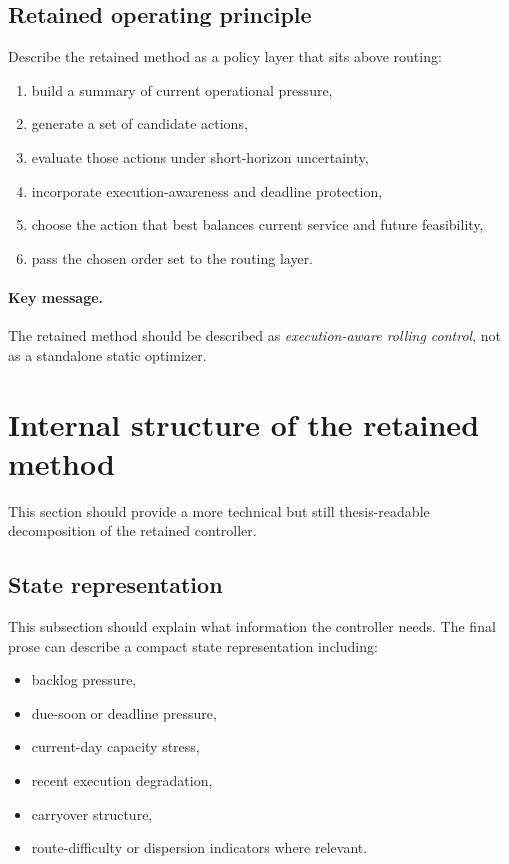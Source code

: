 \subsection{Retained operating principle}
\label{subsec:arch_retained_operating_principle}

Describe the retained method as a policy layer that sits above routing:
\begin{enumerate}
    \item build a summary of current operational pressure,
    \item generate a set of candidate actions,
    \item evaluate those actions under short-horizon uncertainty,
    \item incorporate execution-awareness and deadline protection,
    \item choose the action that best balances current service and future feasibility,
    \item pass the chosen order set to the routing layer.
\end{enumerate}

\paragraph{Key message.}
The retained method should be described as \emph{execution-aware rolling control}, not as a standalone static optimizer.

\section{Internal structure of the retained method}
\label{sec:arch_retained_internal_structure}

This section should provide a more technical but still thesis-readable decomposition of the retained controller.

\subsection{State representation}
\label{subsec:arch_state_representation}

This subsection should explain what information the controller needs. The final prose can describe a compact state representation including:
\begin{itemize}
    \item backlog pressure,
    \item due-soon or deadline pressure,
    \item current-day capacity stress,
    \item recent execution degradation,
    \item carryover structure,
    \item route-difficulty or dispersion indicators where relevant.
\end{itemize}

